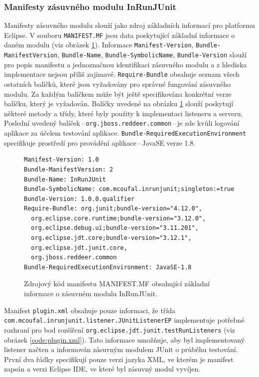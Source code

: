       \subsubsection{Manifesty zásuvného modulu InRunJUnit}
	Manifesty zásuvného modulu slouží jako zdroj základních informací pro platformu Eclipse. V souboru \texttt{MANIFEST.MF} jsou data poskytující základní informace o daném modulu (viz obrázek \ref{code:manifest.mf}). Informace \texttt{Manifest-Version}, \texttt{Bundle-ManifestVersion}, \texttt{Bundle-Name}, \texttt{Bundle-SymbolicName}, \texttt{Bundle-Version} slouží pro popis manifestu a jednoznačnou identifikaci zásuvného modulu a z hlediska implementace nejsou příliš zajímavé. \texttt{Require-Bundle} obsahuje seznam všech ostatních balíčků, které jsou vyžadovány pro správné fungování zásuvného modulu. Za každým balíčkem může být ještě specifikována konkrétní verze balíčku, který je vyžadován. Balíčky uvedené na obrázku \ref{code:manifest.mf} slouží poskytují některé metody a třídy, které byly použity k implementaci listeneru a serveru. Poslední uvedený balíček\,--\,\texttt{org.jboss.reddeer.common}\,--\,je zde kvůli logování aplikace za účelem testování aplikace. \texttt{Bundle-RequiredExecutionEnvironment} specifikuje prostředí pro provádění aplikace\,--\,JavaSE verze 1.8. 
	
	\lstset{language=}
	\begin{figure}[h]
	  \begin{lstlisting}[frame=single]
Manifest-Version: 1.0
Bundle-ManifestVersion: 2
Bundle-Name: InRunJUnit
Bundle-SymbolicName: com.mcoufal.inrunjunit;singleton:=true
Bundle-Version: 1.0.0.qualifier
Require-Bundle: org.junit;bundle-version="4.12.0",
  org.eclipse.core.runtime;bundle-version="3.12.0",
  org.eclipse.debug.ui;bundle-version="3.11.201",
  org.eclipse.jdt.core;bundle-version="3.12.1",
  org.eclipse.jdt.junit.core,
  org.jboss.reddeer.common
Bundle-RequiredExecutionEnvironment: JavaSE-1.8
	  \end{lstlisting}
	  \caption{Zdrojový kód manifestu MANIFEST.MF obsahující základní informace o zásuvném modulu InRunJUnit.}
	  \label{code:manifest.mf}
	\end{figure}
	
	Manifest \texttt{plugin.xml} obsahuje pouze informaci, že třída \texttt{com.mcoufal.inrunjunit.listener.JUnitListenerEP} implementuje potřebné rozhraní pro bod rozšíření \texttt{org.eclipse.jdt.junit.testRunListeners} (viz obrázek \ref{code:plugin.xml}). Tato informace umožňuje, aby byl implementovaný listener načten a informován zásuvným modulem JUnit o průběhu testování. První dva řádky specifikují pouze verzi jazyka XML, ve kterém je manifest zapsán a verzi Eclipse IDE, ve které byl zásuvný modul vyvíjen.  


